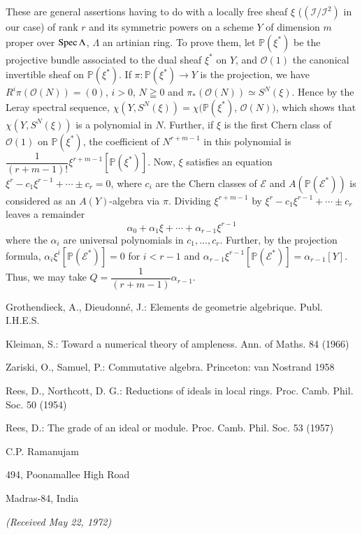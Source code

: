 These are general assertions having to do with a locally free sheaf $\xi$ ($(\mathscr{I}/ \mathscr{I}^2)$ in our case) of rank $r$ and its symmetric powers on a scheme $Y$ of dimension $m$ proper over $\operatorname{Spec} \Lambda$, $\Lambda$ an artinian ring. To prove them, let $\mathbb{P} (\xi^*)$ be the projective bundle associated to the dual sheaf $\xi^*$ on $Y$, and $\mathscr{O}(1)$ the canonical invertible sheaf on $\mathbb{P}(\xi^*)$. If $\pi: \mathbb{P}(\xi^*) \to Y$ is the projection, we have $R^i \pi (\mathscr{O} (N)) = (0)$, $i>0$, $N \geqq 0$ and $\pi_* (\mathscr{O}(N)) \simeq S^N (\xi)$. Hence by the Leray spectral sequence, $\chi (Y,S^N (\xi)) = \chi (\mathbb{P} (\xi^*)$, $\mathscr{O} (N))$, which shows that $\chi (Y, S^N (\xi))$ is a polynomial in $N$. Further, if $\xi$ is the first Chern class of $\mathscr{O}(1)$ on $\mathbb{P} (\xi^*)$, the coefficient of $N^{r+m-1}$ in this polynomial is $\dfrac{1}{(r+m-1)!} \xi^{r+m-1} [\mathbb{P} (\xi^*)]$. Now, $\xi$ satisfies an equation $\xi^r - c_1 \xi^{r-1}+ \cdots \pm c_r = 0 $, where $c_i$ are the Chern classes of $\mathscr{E}$ and $A (\mathbb{P} (\mathscr{E}^*))$ is considered as an $A (Y)$-algebra via $\pi$. Dividing $\xi^{r+m-1}$ by $\xi^{r} - c_1 \xi^{r-1} + \cdots \pm c_r$ leaves a remainder
$$
\alpha_0 + \alpha_1 \xi + \cdots + \alpha_{r-1} \xi^{r-1}
$$
where the $\alpha_i$ are universal polynomials in $c_1, \ldots, c_r$. Further, by the projection formula, $\alpha_i \xi^i [\mathbb{P} (\mathscr{E}^*)] =0$ for $i < r- 1$ and $\alpha_{r-1} \xi^{r-1} [\mathbb{P}(\mathscr{E}^*)] = \alpha_{r-1} [Y]$. Thus, we may take $Q = \dfrac{1}{ (r + m-1)} \alpha_{r-1}$.
 
\begin{thebibliography}{99}
 Grothendieck, A., Dieudonn\'e, J.: Elements de geometrie algebrique. Publ. I.H.E.S.

 Kleiman, S.: Toward a numerical theory of ampleness. Ann. of Maths. 84 (1966)

 Zariski, O., Samuel, P.: Commutative algebra. Princeton: van Nostrand 1958

 Rees, D., Northcott, D. G.: Reductions of ideals in local rings. Proc. Camb. Phil. Soc. 50 (1954)

 Rees, D.: The grade of an ideal or module. Proc. Camb. Phil. Soc. 53 (1957)
\end{thebibliography}

\hfill{C.P. Ramanujam } \hspace{1.8cm}

\hfill{494, Poonamallee High Road} 

\hfill{Madras-84, India} \hspace{1.8cm}

\begin{center}
{\em (Received May 22, 1972)}
\end{center}

\vfill\eject
~\phantom{a}
\thispagestyle{empty}
